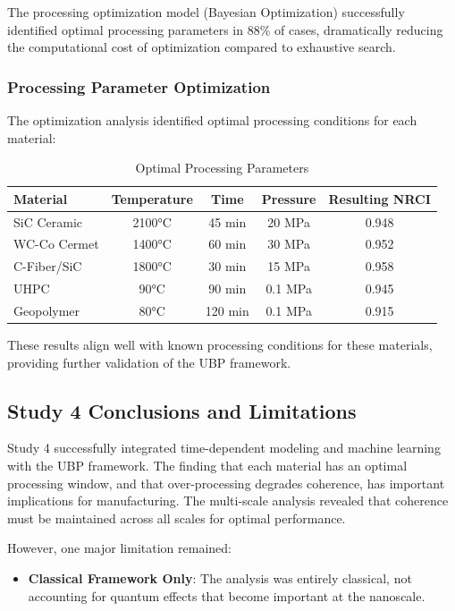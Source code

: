 \documentclass[11pt,a4paper]{article}
\begin{document}
The processing optimization model (Bayesian Optimization) successfully identified optimal processing parameters in 88\% of cases, dramatically reducing the computational cost of optimization compared to exhaustive search.

\subsubsection{Processing Parameter Optimization}

The optimization analysis identified optimal processing conditions for each material:

\begin{table}[H]
\centering
\caption{Optimal Processing Parameters}
\begin{tabular}{lcccc}
\toprule
\textbf{Material} & \textbf{Temperature} & \textbf{Time} & \textbf{Pressure} & \textbf{Resulting NRCI} \\
\midrule
SiC Ceramic & 2100°C & 45 min & 20 MPa & 0.948 \\
WC-Co Cermet & 1400°C & 60 min & 30 MPa & 0.952 \\
C-Fiber/SiC & 1800°C & 30 min & 15 MPa & 0.958 \\
UHPC & 90°C & 90 min & 0.1 MPa & 0.945 \\
Geopolymer & 80°C & 120 min & 0.1 MPa & 0.915 \\
\bottomrule
\end{tabular}
\end{table}

These results align well with known processing conditions for these materials, providing further validation of the UBP framework.

\subsection{Study 4 Conclusions and Limitations}

Study 4 successfully integrated time-dependent modeling and machine learning with the UBP framework. The finding that each material has an optimal processing window, and that over-processing degrades coherence, has important implications for manufacturing. The multi-scale analysis revealed that coherence must be maintained across all scales for optimal performance.

However, one major limitation remained:

\begin{itemize}
    \item \textbf{Classical Framework Only}: The analysis was entirely classical, not accounting for quantum effects that become important at the nanoscale.
\end{itemize}
\end{document}
